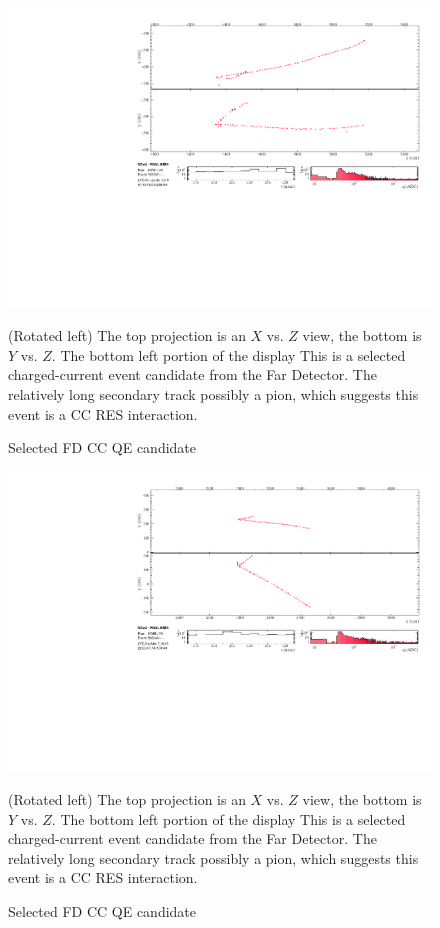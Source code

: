 \begin{figure}
\begin{center}
\vspace{-35pt}

\includegraphics[width=0.87\textheight, angle=90]{figures/results/evd/evd_xzyx-proj_18791_765587.pdf}
\end{center}
\caption{Selected FD \numu CC QE candidate}{
(Rotated left) The top projection is an $X$ vs. $Z$
view, the bottom is $Y$ vs. $Z$.
The bottom left portion of the display
This is a selected \numu charged-current event candidate from the
Far Detector.
The relatively long secondary track possibly a pion, which suggests
this event is a CC RES interaction.}
\label{evd_res_1}
\end{figure}
\begin{figure}
\begin{center}
\vspace{-35pt}

\includegraphics[width=0.87\textheight, angle=90]{figures/results/evd/evd_xzyx-proj_19058_568646.pdf}
\end{center}
\caption{Selected FD \numu CC QE candidate}{
(Rotated left) The top projection is an $X$ vs. $Z$
view, the bottom is $Y$ vs. $Z$.
The bottom left portion of the display
This is a selected \numu charged-current event candidate from the
Far Detector.
The relatively long secondary track possibly a pion, which suggests
this event is a CC RES interaction.}
\label{evd_res_2}
\end{figure}
